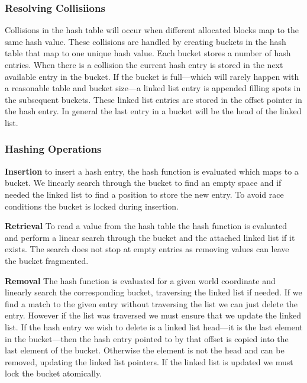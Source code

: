 \documentclass[10pt, twocolumn]{article}
\begin{document}

\subsubsection{Resolving Collisiions}
Collisions in the hash table will occur when different allocated blocks map to
the same hash value. These collisions are handled by creating buckets in the
hash table that map to one unique hash value. Each bucket stores a number of
hash entries. When there is a collision the current hash entry is stored in the
next available entry in the bucket. If the bucket is full---which will rarely
happen with a reasonable table and bucket size---a linked list entry is appended
filling spots in the subsequent buckets. These linked list entries are stored in
the offset pointer in the hash entry. In general the last entry in a bucket will
be the head of the linked list.

\subsubsection{Hashing Operations}

\noindent
\textbf{Insertion} to insert a hash entry, the hash function is evaluated which
maps to a bucket. We linearly search through the bucket to find an empty space
and if needed the linked list to find a position to store the new entry. To
avoid race conditions the bucket is locked during insertion. 

\noindent
\textbf{Retrieval} To read a value from the hash table the hash function is
evaluated and perform a linear search through the bucket and the attached linked
list if it exists. The search does not stop at empty entries as removing values
can leave the bucket fragmented.

\noindent
\textbf{Removal} The hash function is evaluated for a given world coordinate and
linearly search the corresponding bucket, traversing the linked list if needed.
If we find a match to the given entry without traversing the list we can just
delete the entry. However if the list was traversed we must ensure that we
update the linked list. If the hash entry we wish to delete is a linked list
head---it is the last element in the bucket---then the hash entry pointed to by
that offset is copied into the last element of the bucket. Otherwise the element
is not the head and can be removed, updating the linked list pointers. If the
linked list is updated we must lock the bucket atomically.
\end{document}
